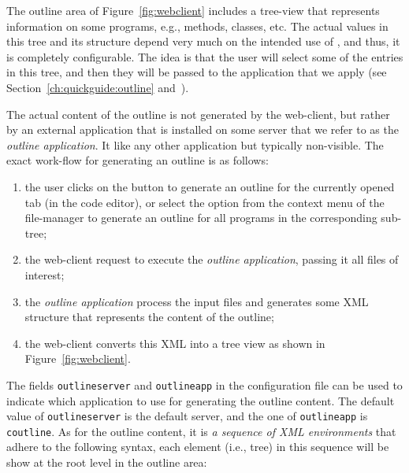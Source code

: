 The outline area of Figure~\ref{fig:webclient} includes a tree-view
that represents information on some programs, e.g., methods, classes,
etc. The actual values in this tree and its structure depend very much
on the intended use of \ei, and thus, it is completely configurable.
%
The idea is that the user will select some of the entries in this
tree, and then they will be passed to the application that we apply
(see Section~\ref{ch:quickguide:outline}
and~).

The actual content of the outline is not generated by the web-client,
but rather by an external application that is installed on some \ei
server that we refer to as the \emph{outline application}. It like any
other application but typically non-visible.  The exact work-flow for
generating an outline is as follows:
%
\begin{enumerate}

\item the user clicks on the  button to generate an
  outline for the currently opened tab (in the code editor), or select
  the  option from the context menu of the file-manager
  to generate an outline for all programs in the corresponding
  sub-tree;

\item the web-client request to execute the \emph{outline
    application}, passing it all files of interest;

\item the \emph{outline application} process the input files and
  generates some XML structure that represents the content of the
  outline;

\item the web-client converts this XML into a tree view as shown in
  Figure~\ref{fig:webclient}.

\end{enumerate}
%
The fields \texttt{outlineserver} and \texttt{outlineapp} in the
configuration file can be used to indicate which application to use
for generating the outline content. The default value of
\texttt{outlineserver} is the default server, and the one of
\texttt{outlineapp} is \texttt{coutline}. As for the outline content,
it is \emph{a sequence of XML environments} that adhere to the
following syntax, each element (i.e., tree) in this sequence will be
show at the root level in the outline area:

